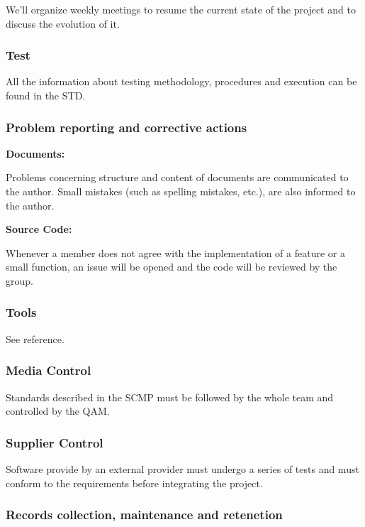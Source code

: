 \documentclass[12pt]{article}
\begin{document}
We'll organize weekly meetings to resume the current state of the
project and to discuss the evolution of it.

\subsubsection{Test}\label{test}

All the information about testing methodology, procedures and execution
can be found in the STD.

\subsubsection{Problem reporting and corrective
actions}\label{problem-reporting-and-corrective-actions}

\textbf{Documents:}

Problems concerning structure and content of documents are communicated
to the author. Small mistakes (such as spelling mistakes, etc.), are
also informed to the author.

\textbf{Source Code:}

Whenever a member does not agree with the implementation of a feature or
a small function, an issue will be opened and the code will be reviewed
by the group.

\subsubsection{Tools}\label{tools}

See reference.

\subsubsection{Media Control}\label{media-control}

Standards described in the SCMP must be followed by the whole team and
controlled by the QAM.

\subsubsection{Supplier Control}\label{supplier-control}

Software provide by an external provider must undergo a series of tests
and must conform to the requirements before integrating the project.

\subsubsection{Records collection, maintenance and
retenetion}\label{records-collection-maintenance-and-retenetion}
\end{document}
